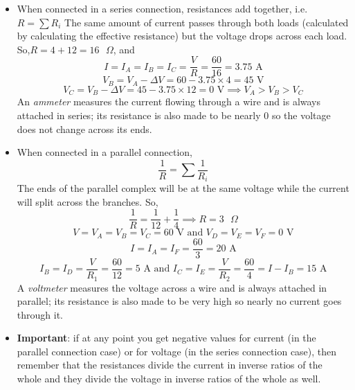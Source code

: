 \documentclass{scrartcl}
\begin{document}
    \begin{itemize}
        \item When connected in a series connection, resistances add together, i.e. $\boxed{R=\sum R_i}$ The same amount of current passes through both loads (calculated by calculating the effective resistance) but the voltage drops across each load. So,\newline$R=4+12=\boxed{16\text{ }\Omega}$, and \[I=I_A=I_B=I_C=\frac VR=\frac{60}{16}=\boxed{3.75\text{ A}}\]\[V_B=V_A-\Delta V=60-3.75\times4=\boxed{45\text{ V}}\]\[V_C=V_B-\Delta V=45-3.75\times12=\boxed{0\text{ V}}\implies\boxed{V_A>V_B>V_C}\] An \textit{ammeter} measures the current flowing through a wire and is always attached in series; its resistance is also made to be nearly 0 so the voltage does not change across its ends.
        \item When connected in a parallel connection, \[\boxed{\frac1R=\sum\frac1{R_i}}\] The ends of the parallel complex will be at the same voltage while the current will split across the branches. So, \[\frac1R=\frac1{12}+\frac14\implies R=\boxed{3\text{ }\Omega}\]\[V=V_A=V_B=V_C=\boxed{60\text{ V}}\text{ and }V_D=V_E=V_F=\boxed{0\text{ V}}\]\[I=I_A=I_F=\frac{60}3=\boxed{20\textrm{ A}}\]\[I_B=I_D=\frac V{R_1}=\frac{60}{12}=\boxed{5\textrm{ A}}\text{ and }I_C=I_E=\frac V{R_2}=\frac{60}4=I-I_B=\boxed{15\textrm{ A}}\] A \textit{voltmeter} measures the voltage across a wire and is always attached in parallel; its resistance is also made to be very high so nearly no current goes through it.
        \item \textbf{Important}: if at any point you get negative values for current (in the parallel connection case) or for voltage (in the series connection case), then remember that the resistances divide the current in inverse ratios of the whole and they divide the voltage in inverse ratios of the whole as well.
    \end{itemize}
\end{document}
